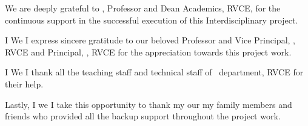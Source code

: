 \ifIDP
We are deeply grateful to \textbf{\printDA}, Professor and Dean Academics, RVCE, for the continuous support in the successful execution of this Interdisciplinary project.
\\ \par
\fi
\ifPG I \else \ifStuNameBUsed We \else I \fi\fi express sincere gratitude to our beloved Professor and Vice Principal, \textbf{\printVicePrincipal}, RVCE and Principal, \textbf{\printPrincipal}, RVCE for the appreciation towards this project work.\\ \par

\ifIDP \else\ifPG I \else\ifStuNameBUsed We \else I \fi\fi thank all the teaching staff and technical staff of \ifIDP \printGuideDeptAInLF\else\printDepartmentLF\fi\, department, RVCE for their help.\\ \par \fi

Lastly, \ifPG I \else\ifStuNameBUsed we \else I \fi\fi take this opportunity to thank \ifPG my \else\ifStuNameBUsed our \else my \fi\fi family members and friends who provided all the backup support throughout the project work.\\ \par